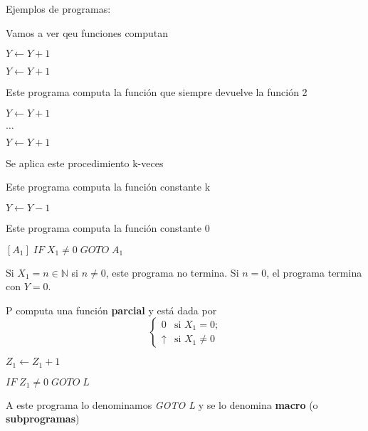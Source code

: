 Ejemplos de programas:
 
Vamos a ver qeu funciones computan
 
\begin{example}
$Y \leftarrow Y + 1$
 
$Y \leftarrow Y + 1$
 
Este programa computa la funci\'on que siempre devuelve la funci\'on 2
\end{example}
 
\begin{example}
 
$Y \leftarrow Y + 1$
 
$\ldots$
 
$Y \leftarrow Y + 1$
 
Se aplica este procedimiento k-veces
 
Este programa computa la funci\'on constante k
\end{example}
 
\begin{example}
$Y \leftarrow Y - 1$
 
Este programa computa la funci\'on constante 0
\end{example}
 
\begin{example}
$[A_1] \; IF \; X_1 \neq 0 \; GOTO \; A_1$
 
Si $X_1 = n \in \mathbb{N}$ si $n \neq 0$, este programa no termina. Si $n = 0$, el programa termina con $Y = 0$. 
 
P computa una funci\'on \textbf{parcial} y est\'a dada por
\[
\begin{cases}
	0 			&\text{si $X_1 = 0$;} \\
	\uparrow 	&\text{si $X_1 \neq 0$}
\end{cases}
\]
\end{example}
 
\begin{example}
$Z_1 \leftarrow Z_1 + 1$
 
$IF \; Z_1 \neq 0 \; GOTO \; L$
 
A este programa lo denominamos \textit{GOTO L} y se lo denomina \textbf{macro} (o \textbf{subprogramas})
\end{example}
 
